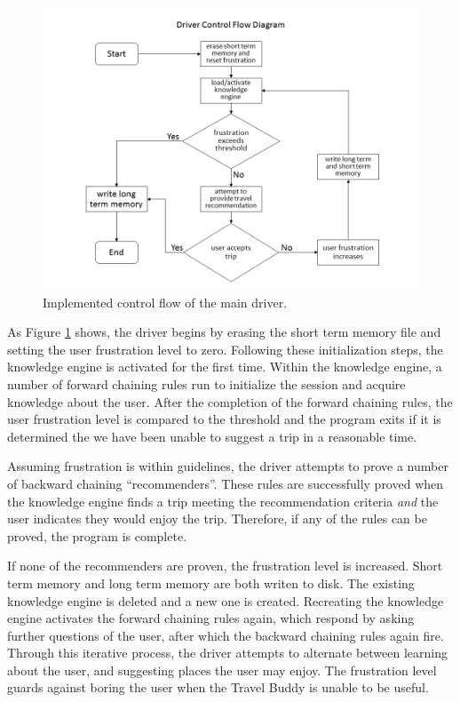 \documentclass[11pt]{article} %
\begin{document}
\begin{figure}[H]
\centering
\includegraphics[width=12cm]{driver_control_flow.png}
\caption{Implemented control flow of the main driver.\label{fig:driver}}
\end{figure}

As Figure \ref{fig:driver} shows, the driver begins by erasing the short term memory file and setting the user frustration level to zero. Following these initialization steps, the knowledge engine is activated for the first time. Within the knowledge engine, a number of forward chaining rules run to initialize the session and acquire knowledge about the user. After the completion of the forward chaining rules, the user frustration level is compared to the threshold and the program exits if it is determined the we have been unable to suggest a trip in a reasonable time.

Assuming frustration is within guidelines, the driver attempts to prove a number of backward chaining ``recommenders''. These rules are successfully proved when the knowledge engine finds a trip meeting the recommendation criteria \emph{and} the user indicates they would enjoy the trip. Therefore, if any of the rules can be proved, the program is complete.

If none of the recommenders are proven, the frustration level is increased. Short term memory and long term memory are both writen to disk. The existing knowledge engine is deleted and a new one is created. Recreating the knowledge engine activates the forward chaining rules again, which respond by asking further questions of the user, after which the backward chaining rules again fire. Through this iterative process, the driver attempts to alternate between learning about the user, and suggesting places the user may enjoy. The frustration level guards against boring the user when the Travel Buddy is unable to be useful.
\end{document}
